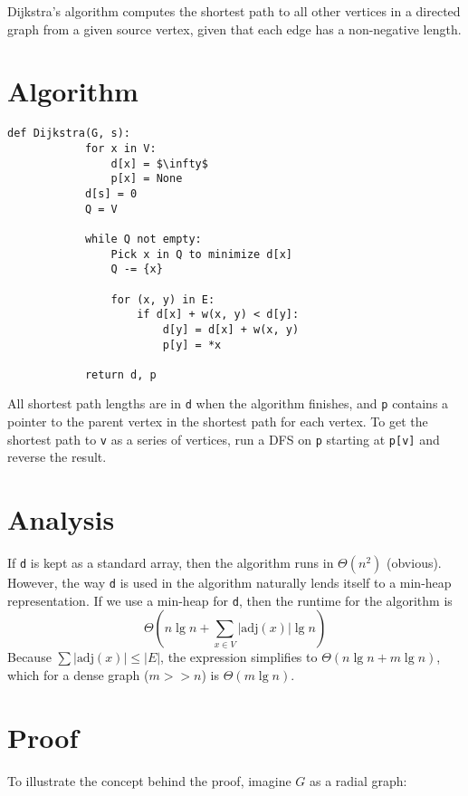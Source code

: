 \documentclass[11pt]{article}
\begin{document}
	Dijkstra's algorithm computes the shortest path to all other vertices in a directed graph from a given source vertex, given that each edge has a non-negative length.
	
\section{Algorithm}
	\begin{lstlisting}[autogobble=true,mathescape]
		def Dijkstra(G, s):
			for x in V:
				d[x] = $\infty$
				p[x] = None
			d[s] = 0
			Q = V
			
			while Q not empty:
				Pick x in Q to minimize d[x]
				Q -= {x}
				
				for (x, y) in E:
					if d[x] + w(x, y) < d[y]:
						d[y] = d[x] + w(x, y)
						p[y] = *x
						
			return d, p
	\end{lstlisting}

	All shortest path lengths are in \verb|d| when the algorithm finishes, and \verb|p| contains a pointer to the parent vertex in the shortest path for each vertex. To get the shortest path to \verb|v| as a series of vertices, run a DFS on \verb|p| starting at \verb|p[v]| and reverse the result. 

\section{Analysis}
	If \verb|d| is kept as a standard array, then the algorithm runs in $\Theta(n^2)$ (obvious). However, the way \verb|d| is used in the algorithm naturally lends itself to a min-heap representation. If we use a min-heap for \verb|d|, then the runtime for the algorithm is
	\begin{equation}
		\Theta(n\lg n + \sum_{x\in V} |\text{adj}(x)| \lg n)
	\end{equation}
	Because $\sum |\text{adj}(x)| \leq |E|$, the expression simplifies to $\Theta(n\lg n + m\lg n)$, which for a dense graph ($m >> n$) is $\Theta(m\lg n)$.
	
\section{Proof}
	To illustrate the concept behind the proof, imagine $G$ as a radial graph:
	
\end{document}
